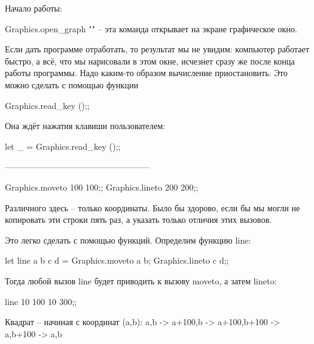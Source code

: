 Начало работы:

Graphics.open_graph "" -- эта команда открывает на экране графическое окно.

Если дать программе отработать, то результат мы не увидим: компьютер работает быстро,
а всё, что мы нарисовали в этом окне, исчезнет сразу же после конца работы программы.
Надо каким-то образом вычисление приостановить. Это можно сделать с помощью функции

Graphics.read_key ();;

Она ждёт нажатия клавиши пользователем:

let _ = Graphics.read_key ();;

---------------------------------------------------

Graphics.moveto 100 100;;
Graphics.lineto 200 200;;


Различного здесь -- только координаты. Было бы здорово, если бы мы могли не копировать
эти строки пять раз, а указать только отличия этих вызовов.

Это легко сделать с помощью функций.
Определим функцию line:

let line a b c d = Graphics.moveto a b; Graphics.lineto c d;;

Тогда любой вызов line будет приводить к вызову moveto, а затем lineto:

line 10 100 10 300;;


Квадрат -- начиная с координат (a,b):
a,b -> a+100,b -> a+100,b+100 -> a,b+100 -> a,b


